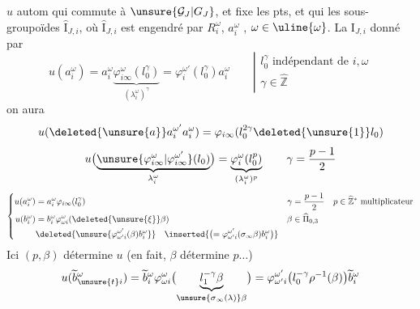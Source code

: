 $u$ autom  qui commute à $\unsure{\mathcal G_J|G_J}$, et fixe les pts,
et qui   les sous-groupoïdes $\widehat{\mathrm I}_{J,i}$, où $\widehat{\mathrm I}_{J,i}$ est engendré par $R_i^\omega$, $a_i^\omega$ \unsure{$\in$}, $\omega\in\uline{\omega}$. La   $\mathrm I_{J,i}$  donné par
\[
u(a_i^\omega)=a_i^\omega\underbrace{\varphi_{i\infty}^\omega(l_0^\gamma)}_{(\lambda_i^\omega)^\gamma}
=\varphi_i^{\omega'}(l_0^\gamma)a_i^\omega
\qquad\left|\begin{array}{l}l_0^\gamma\text{ indépendant de }i,\omega\\\gamma\in\widehat{\mathbb Z}\end{array}\right.
\]
on aura
\[
u(\deleted{\unsure{a}}a_i^{\omega'}a_i^\omega)=\varphi_{i\infty}(l_0^{2\gamma}\deleted{\unsure{1}}l_0)
\]
\[
u\bigl(\underbrace{\unsure{\varphi_{i\infty}^{\omega}|\varphi_{i\infty}^{\omega'}}(l_0)}_{\lambda_i^\omega}\bigr)
=\underbrace{\varphi_i^\omega(l_0^p)}_{(\lambda_i^\omega)^p}
\qquad\gamma=\frac{p-1}{2}
\]
\[
\left\{\begin{aligned}
u(a_i^\omega)&=a_i^\omega\varphi_{i\infty}(l_0^\gamma)
&\gamma&=\frac{p-1}{2}\quad p\in\widehat{\mathbb Z}^{*}\text{ multiplicateur}\\
u(b_i^\omega)&=b_i^\omega\varphi_{\omega i}^\omega(\deleted{\unsure{\xi}}\beta)
&\beta&\in\widehat\Pi_{0,3}\\
&\deleted{\unsure{\varphi_{\omega'i}^{\omega'}(\beta)b_i^\omega}}\quad
\inserted{\bigl(=\varphi_{\omega'i}^{\omega'}(\sigma_\infty\beta)b_i^\omega\bigr)}
\end{aligned}\right.
\]
Ici  $(p,\beta)$ détermine $u$ (en fait, $\beta$ détermine $p\ldots$)
\[
u(\widetilde b_{\unsure{t}i}^\omega)=\widetilde b_i^\omega\varphi_{\omega i}^\omega
\bigl(\underbrace{l_1^{-\gamma}\beta}_{\unsure{\sigma_\infty(\lambda)}\beta}\bigr)
=\varphi_{\omega'i}^{\omega'}\bigl(l_0^{-\gamma}\rho^{-1}(\beta)\bigr)\widetilde b_i^\omega
\]
